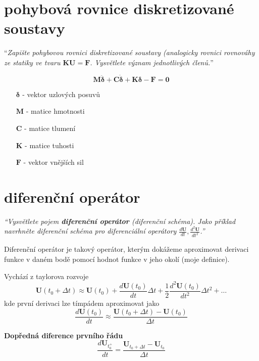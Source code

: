 \documentclass{article}
\begin{document}
	\section{pohybová rovnice diskretizované soustavy}
	``\emph{Zapište pohybovou rovnici diskretizované soustavy (analogicky rovnici rovnováhy ze statiky ve tvaru $\bm{K}\bm{U} = \bm{F}$. Vysvětlete význam jednotlivých členů.}''

	\begin{equation}
		\bm{M}\bm{\ddot{\delta}} + \bm{C}\bm{\dot{\delta}} + \bm{K}\bm{\delta} - \bm{F} = \bm{0}
	\end{equation}
	\begin{itemize}
		\item [$\bm{\delta}$] - vektor uzlových posuvů
		\item [$\bm{M}$] - matice hmotnosti
		\item [$\bm{C}$] - matice tlumení
		\item [$\bm{K}$] - matice tuhosti
		\item [$\bm{F}$] - vektor vnějších sil
	\end{itemize}

	\section{diferenční operátor}
	\emph{``Vysvětlete pojem \textbf{diferenční operátor} (diferenční schéma). Jako příklad navrhněte diferenční schéma pro diferenciální operátory $\frac{d\bm{U}}{dt},\frac{d^2\bm{U}}{dt^2}$.''}

	Diferenční operátor je takový operátor, kterým dokážeme aproximovat derivaci funkce v daném bodě pomocí hodnot funkce v jeho okolí (moje definice).
	
	Vychází z taylorova rozvoje
	\begin{equation}
		\bm{U}(t_0+\Delta t) \approx \bm{U}(t_0) + \frac{d\bm{U}(t_0)}{dt} \Delta t + \frac{1}{2} \frac{d^2\bm{U}(t_0)}{dt^2} \Delta t^2 + \dots
	\end{equation}
	kde první derivaci lze tímpádem aproximovat jako
	\begin{equation}
		\frac{d\bm{U}(t_0)}{dt} \approx \frac{\bm{U}(t_0+\Delta t) - \bm{U}(t_0)}{\Delta t}
	\end{equation}

	\textbf{Dopředná diference prvního řádu}
	\begin{equation}
		\frac{d\bm{U}_{t_0^+}}{dt} = \frac{\bm{U}_{t_0+\Delta t} - \bm{U}_{t_0}}{\Delta t}
	\end{equation}
\end{document}
